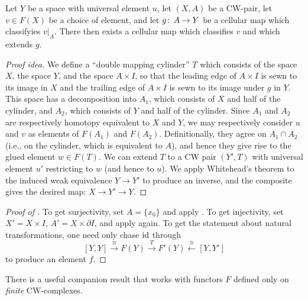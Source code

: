 \begin{lemma}\label{ClassifiedMapsAlwaysExtend}%
Let $Y$ be a space with universal element $u$, let $(X, A)$ be a CW-pair, let $v \in F(X)$ be a choice of element, and let $g\colon\thinspace A \to Y$ be a cellular map which classifyies $v|_A$.
There then exists a cellular map which classifies $v$ and which extends $g$.
\end{lemma}
\begin{proof}[Proof idea]
We define a ``double mapping cylinder'' $T$ which consists of the space $X$, the space $Y$, and the space $A \times I$, so that the leading edge of $A \times I$ is sewn to its image in $X$ and the trailing edge of $A \times I$ is sewn to its image under $g$ in $Y$.
This space has a decomposition into $A_1$, which consists of $X$ and half of the cylinder, and $A_2$, which consists of $Y$ and half of the cylinder.
Since $A_1$ and $A_2$ are respectively homotopy equivalent to $X$ and $Y$, we may respectively consider $u$ and $v$ as elements of $F(A_1)$ and $F(A_2)$.
Definitionally, they agree on $A_1 \cap A_2$ (i.e., on the cylinder, which is equivalent to $A$), and hence they give rise to the glued element $w \in F(T)$.
We can extend $T$ to a CW pair $(Y', T)$ with universal element $u'$ restricting to $w$ (and hence to $u$).
We apply Whitehead's theorem to the induced weak equivalence $Y \to Y'$ to produce an inverse, and the composite gives the desired map: $X \to Y' \to Y$.
\end{proof}

\begin{proof}[{Proof of }]
To get surjectivity, set $A = \{x_0\}$ and apply .
To get injectivity, set $X' = X \times I$, $A' = X \times \partial I$, and apply  again.
To get the statement about natural transformations, one need only chase $\operatorname{id}$ through \[[Y, Y] \xrightarrow\cong F(Y) \xrightarrow{T} F'(Y) \xleftarrow\cong [Y, Y']\] to produce an element $f$.
\end{proof}

There is a useful companion result that works with functors $F$ defined only on \emph{finite} CW-complexes.

